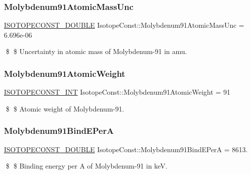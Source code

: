 \subsubsection{\texorpdfstring{Molybdenum91\+Atomic\+Mass\+Unc}{Molybdenum91AtomicMassUnc}}
{\footnotesize\ttfamily \mbox{\hyperlink{group___isotope_const-_macros_ga8f45a7272ce02c0b4c65c44636ed719a}{I\+S\+O\+T\+O\+P\+E\+C\+O\+N\+S\+T\+\_\+\+D\+O\+U\+B\+LE}} Isotope\+Const\+::\+Molybdenum91\+Atomic\+Mass\+Unc = 6.\+696e-\/06}

\$ \$ Uncertainty in atomic mass of Molybdenum-\/91 in amu. \mbox{\label{group___isotope_const-_molybdenum-_mo91_ga73b8805925cd888c44f09b76bb2c89c6}} 
\subsubsection{\texorpdfstring{Molybdenum91\+Atomic\+Weight}{Molybdenum91AtomicWeight}}
{\footnotesize\ttfamily \mbox{\hyperlink{group___isotope_const-_macros_ga5f18360b3e99483a35c32d789e62621c}{I\+S\+O\+T\+O\+P\+E\+C\+O\+N\+S\+T\+\_\+\+I\+NT}} Isotope\+Const\+::\+Molybdenum91\+Atomic\+Weight = 91}

\$ \$ Atomic weight of Molybdenum-\/91. \mbox{\label{group___isotope_const-_molybdenum-_mo91_gae4c80ad55cefd817e6c57764b3e88a3d}} 
\subsubsection{\texorpdfstring{Molybdenum91\+Bind\+E\+PerA}{Molybdenum91BindEPerA}}
{\footnotesize\ttfamily \mbox{\hyperlink{group___isotope_const-_macros_ga8f45a7272ce02c0b4c65c44636ed719a}{I\+S\+O\+T\+O\+P\+E\+C\+O\+N\+S\+T\+\_\+\+D\+O\+U\+B\+LE}} Isotope\+Const\+::\+Molybdenum91\+Bind\+E\+PerA = 8613.}

\$ \$ Binding energy per A of Molybdenum-\/91 in keV. \mbox{\label{group___isotope_const-_molybdenum-_mo91_ga2e7ce42ef8b0bc05c897fc98ba206bc1}} 
